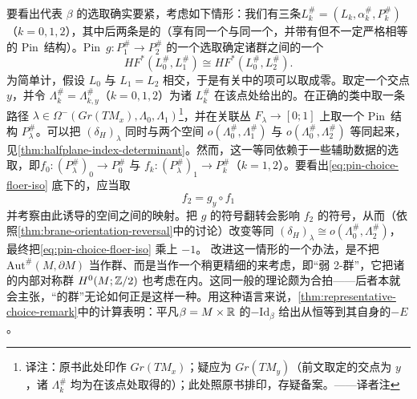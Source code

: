 \begin{remark}\label{thm:representative-choice-remark}
要看出代表 $\beta$ 的选取确实要紧，考虑如下情形：我们有三条\trExactLagrangianBrane{}$L_k^{\#}=(L_k,\alpha_k^{\#},P_k^{\#})$（$k=0,1,2$），其中后两条是\trIsomorphic{}的（享有同一个\trLagrange\trSubmanifold{}与同一个\trGrading，并带有\trIsomorphic{}但不一定严格相等的 Pin~结构）。Pin~\trIsomorphism{}$g\colon P_1^{\#}\to P_2^{\#}$ 的一个选取确定诸\trFloerCohomology{}群之间的一个\trIsomorphism
\begin{equation}\label{eq:pin-choice-floer-iso}
HF^*(L_0^{\#},L_1^{\#})\cong HF^*(L_0^{\#},L_2^{\#}).
\end{equation}
为简单计，假设 $L_0$ 与 $L_1=L_2$ \trTransverse{}相交，于是有关\trFloerDatum{}中的\trHamilton{}项可以取成零。取定一个交点 $y$，并令 $\Lambda_k^{\#}=\Lambda_{k,y}^{\#}$（$k=0,1,2$）为诸 $L_k^{\#}$ 在该点处给出的\trLinear\trBrane。在正确的\trHomotopy{}类中取一条路径 $\lambda\in\Omega^-(Gr(TM_x),\Lambda_0,\Lambda_1)$\footnote{译注：原书此处印作 $Gr(TM_x)$；疑应为 $Gr(TM_y)$（前文取定的交点为 $y$，诸 $\Lambda_k^{\#}$ 均为在该点处取得的\trLinear\trBrane）；此处照原书排印，存疑备案。——译者注}，并在关联丛 $F_\lambda\to[0;1]$ 上取一个 Pin~结构 $P_\lambda^{\#}$。可以把 $(\delta_H)_\lambda$ 同时与两个\trOrientation{}空间 $o(\Lambda_0^{\#},\Lambda_1^{\#})$ 与 $o(\Lambda_0^{\#},\Lambda_2^{\#})$ 等同起来，见\cref{thm:halfplane-index-determinant}。然而，这一等同依赖于一些辅助数据的选取，即\trIsomorphism{}$f_0\colon(P_\lambda^{\#})_0\to P_0^{\#}$ 与 $f_k\colon(P_\lambda^{\#})_1\to P_k^{\#}$（$k=1,2$）。要看出\eqref{eq:pin-choice-floer-iso} 底下的\trChainMap，应当取
\begin{equation*}
f_2=g_y\circ f_1
\end{equation*}
并考察由此诱导的\trOrientation{}空间之间的映射。把 $g$ 的符号翻转会影响 $f_2$ 的符号，从而（依照\cref{thm:brane-orientation-reversal}中的讨论）改变等同 $(\delta_H)_\lambda\cong o(\Lambda_0^{\#},\Lambda_2^{\#})$，最终把\eqref{eq:pin-choice-floer-iso} 乘上 $-1$。
改进这一情形的一个办法，是不把 $\mathrm{Aut}^{\#}(M,\partial M)$ 当作群、而是当作一个稍更精细的\trObject{}来考虑，即“弱 2-群”，它把诸\trLineBundle{}的内部对称群 $H^0(M;\mathbb{Z}/2)$ 也考虑在内。这同一般的\trCategory{}理论颇为合拍——后者本就会主张，“\trCategory{}的\trAutomorphism{}群”无论如何正是这样一种\trObject。用这种语言来说，\cref{thm:representative-choice-remark}中的计算表明：平凡\trLineBundle{}$\beta=M\times\mathbb{R}$ 的\trAutomorphism{}$-\mathrm{Id}_\beta$ 给出从恒等\trFunctor{}到其自身的\trNaturalTransformation{}$-E$。
\end{remark}
